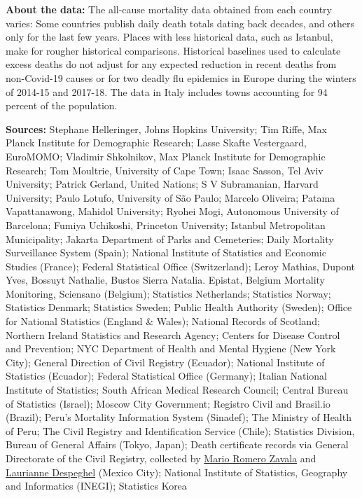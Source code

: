 \textbf{About the data:} The all-cause mortality data obtained from each
country varies: Some countries publish daily death totals dating back
decades, and others only for the last few years. Places with less
historical data, such as Istanbul, make for rougher historical
comparisons. Historical baselines used to calculate excess deaths do not
adjust for any expected reduction in recent deaths from non-Covid-19
causes or for two deadly flu epidemics in Europe during the winters of
2014-15 and 2017-18. The data in Italy includes towns accounting for 94
percent of the population.

\textbf{Sources:} Stephane Helleringer, Johns Hopkins University; Tim
Riffe, Max Planck Institute for Demographic Research; Lasse Skafte
Vestergaard, EuroMOMO; Vladimir Shkolnikov, Max Planck Institute for
Demographic Research; Tom Moultrie, University of Cape Town; Isaac
Sasson, Tel Aviv University; Patrick Gerland, United Nations; S V
Subramanian, Harvard University; Paulo Lotufo, University of São Paulo;
Marcelo Oliveira; Patama Vapattanawong, Mahidol University; Ryohei Mogi,
Autonomous University of Barcelona; Fumiya Uchikoshi, Princeton
University; Istanbul Metropolitan Municipality; Jakarta Department of
Parks and Cemeteries; Daily Mortality Surveillance System (Spain);
National Institute of Statistics and Economic Studies (France); Federal
Statistical Office (Switzerland); Leroy Mathias, Dupont Yves, Bossuyt
Nathalie, Bustos Sierra Natalia. Epistat, Belgium Mortality Monitoring,
Sciensano (Belgium); Statistics Netherlands; Statistics Norway;
Statistics Denmark; Statistics Sweden; Public Health Authority (Sweden);
Office for National Statistics (England \& Wales); National Records of
Scotland; Northern Ireland Statistics and Research Agency; Centers for
Disease Control and Prevention; NYC Department of Health and Mental
Hygiene (New York City); General Direction of Civil Registry (Ecuador);
National Institute of Statistics (Ecuador); Federal Statistical Office
(Germany); Italian National Institute of Statistics; South African
Medical Research Council; Central Bureau of Statistics (Israel); Moscow
City Government; Registro Civil and Brasil.io (Brazil); Peru's Mortality
Information System (Sinadef); The Ministry of Health of Peru; The Civil
Registry and Identification Service (Chile); Statistics Division, Bureau
of General Affairs (Tokyo, Japan); Death certificate records via General
Directorate of the Civil Registry, collected by
\href{https://datos.nexos.com.mx/?p=1458}{Mario Romero Zavala} and
\href{https://github.com/mariorz/folio-deceso}{Laurianne Despeghel}
(Mexico City); National Institute of Statistics, Geography and
Informatics (INEGI); Statistics Korea

